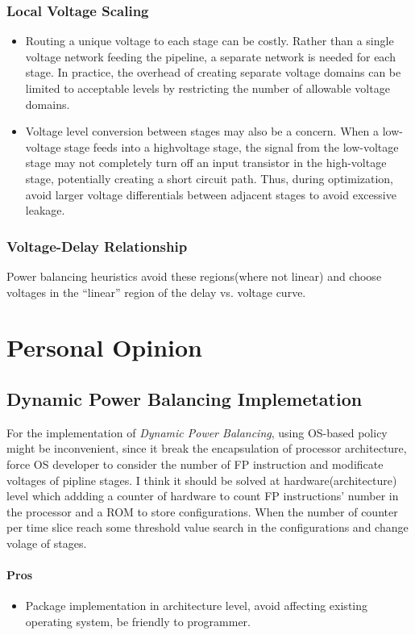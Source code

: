 \documentclass[10pt,a4paper]{article}
\begin{document}
\subsubsection{Local Voltage Scaling}
\begin{itemize}
    \item Routing a unique voltage to each stage can be costly. Rather
    than a single voltage network feeding the pipeline, a separate network is needed for each stage. In practice, the overhead of creating separate voltage domains can be limited to acceptable levels by restricting the number of allowable voltage domains.
    \item Voltage level conversion between stages may also be a concern. When a low-voltage stage feeds into a highvoltage stage, the signal from the low-voltage stage may not completely turn off an input transistor in the high-voltage
    stage, potentially creating a short circuit path. Thus, during optimization, avoid larger voltage differentials between adjacent stages to avoid excessive leakage.
\end{itemize}
\subsubsection{Voltage-Delay Relationship}
Power balancing heuristics avoid these regions(where not linear) and choose voltages in the “linear” region of the delay vs. voltage curve.
\section{Personal Opinion}
\subsection{Dynamic Power Balancing Implemetation}
For the implementation of \emph{Dynamic Power Balancing}, using OS-based policy might be inconvenient, since it break the encapsulation of processor architecture, force OS developer to consider the number of FP instruction and modificate voltages of pipline stages. I think it should be solved at hardware(architecture) level which addding a counter of hardware to count FP instructions' number in the processor and a ROM to store configurations. When the number of counter per time slice reach some threshold value search in the configurations and change volage of stages.
\paragraph{Pros}
\begin{itemize}
    \item Package implementation in architecture level, avoid affecting existing operating system, be friendly to programmer.
\end{itemize}
\end{document}
